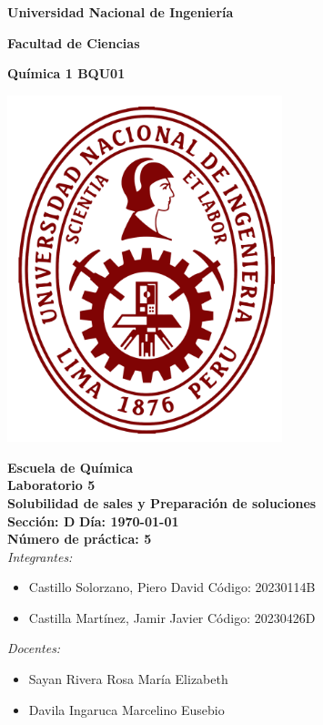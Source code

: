 \documentclass[main.tex]{subfiles}
\begin{document}
\onecolumn

\begin{center}
\textbf{\fontsize{16}{\baselineskip}\selectfont Universidad Nacional de Ingeniería}

\bigskip

\textbf{\fontsize{16}{\baselineskip}\selectfont Facultad de Ciencias}

\bigskip

\textbf{\fontsize{18}{\baselineskip}\selectfont Química 1 BQU01}

\bigskip

\includegraphics[width=8cm]{uni-logo.png}

\textbf{\fontsize{16}{\baselineskip}\selectfont Escuela de Química}
\bigskip \\
\textbf{\fontsize{20}{\baselineskip}\selectfont Laboratorio 5}
\bigskip \\
\textbf{\fontsize{19}{\baselineskip}\selectfont Solubilidad de sales y Preparación de soluciones}
\bigskip \\
\textbf{\fontsize{18}{\baselineskip}\selectfont Sección: D}
\quad \quad
\textbf{\fontsize{18}{\baselineskip}\selectfont Día: \today}
\bigskip \\
\textbf{\fontsize{16}{\baselineskip}\selectfont Número de práctica: 5}
\bigskip \\

\textit{\fontsize{16}{\baselineskip}\selectfont Integrantes:}

\begin{itemize}
    \item \fontsize{16}{\baselineskip}\selectfont Castillo Solorzano, Piero David   \quad Código: 20230114B
    \item \fontsize{16}{\baselineskip}\selectfont Castilla Martínez, Jamir Javier   \quad Código: 20230426D
\end{itemize}

\textit{\fontsize{16}{\baselineskip}\selectfont Docentes:}

\begin{itemize}
    \item \fontsize{16}{\baselineskip}\selectfont Sayan Rivera Rosa María Elizabeth
    \item \fontsize{16}{\baselineskip}\selectfont Davila Ingaruca Marcelino Eusebio
\end{itemize}

\bigskip
\end{center}

\clearpage
\end{document}
